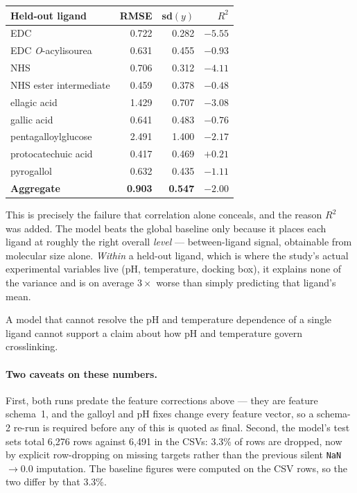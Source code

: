 \documentclass[11pt,a4paper]{article}
\newcommand{\ok}[1]{\textcolor{okgreen}{#1}}
\newcommand{\bad}[1]{\textcolor{badred}{#1}}
\newcommand{\code}[1]{\texttt{\small #1}}
\begin{document}
\begin{center}
\small
\begin{tabular}{@{}lrrr@{}}
\toprule
\textbf{Held-out ligand} & \textbf{RMSE} & \textbf{sd$(y)$} & \textbf{$R^2$} \\
\midrule
EDC                      & 0.722 & 0.282 & \bad{$-5.55$} \\
EDC \emph{O}-acylisourea & 0.631 & 0.455 & \bad{$-0.93$} \\
NHS                      & 0.706 & 0.312 & \bad{$-4.11$} \\
NHS ester intermediate   & 0.459 & 0.378 & \bad{$-0.48$} \\
ellagic acid             & 1.429 & 0.707 & \bad{$-3.08$} \\
gallic acid              & 0.641 & 0.483 & \bad{$-0.76$} \\
pentagalloylglucose      & 2.491 & 1.400 & \bad{$-2.17$} \\
protocatechuic acid      & 0.417 & 0.469 & \ok{$+0.21$} \\
pyrogallol               & 0.632 & 0.435 & \bad{$-1.11$} \\
\midrule
\textbf{Aggregate}       & \textbf{0.903} & \textbf{0.547} & \bad{\textbf{$-2.00$}} \\
\bottomrule
\end{tabular}
\end{center}

This is precisely the failure that correlation alone conceals, and the reason
$R^2$ was added. The model beats the global baseline only because it places
each ligand at roughly the right overall \emph{level} --- between-ligand
signal, obtainable from molecular size alone. \emph{Within} a held-out ligand,
which is where the study's actual experimental variables live (pH,
temperature, docking box), it explains none of the variance and is on average
$3\times$ worse than simply predicting that ligand's mean.

A model that cannot resolve the pH and temperature dependence of a single
ligand cannot support a claim about how pH and temperature govern
crosslinking.

\paragraph{Two caveats on these numbers.} First, both runs predate the
feature corrections above --- they are feature schema~1, and the galloyl and
pH fixes change every feature vector, so a schema-2 re-run is required before
any of this is quoted as final. Second, the model's test sets total 6{,}276
rows against 6{,}491 in the CSVs: 3.3\% of rows are dropped, now by explicit
row-dropping on missing targets rather than the previous silent
\code{NaN}$\to$0.0 imputation. The baseline figures were computed on the CSV
rows, so the two differ by that 3.3\%.
\end{document}
